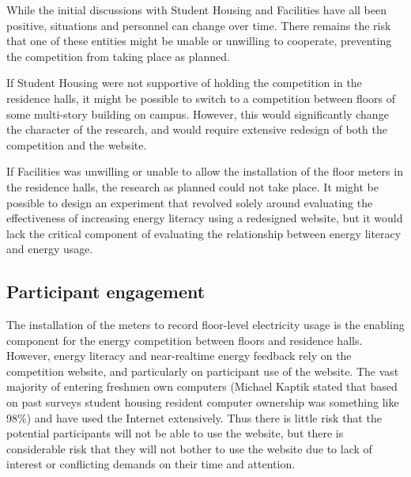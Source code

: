 While the initial discussions with Student Housing and Facilities have all been positive, situations and personnel can change over time. There remains the risk that one of these entities might be unable or unwilling to cooperate, preventing the competition from taking place as planned.

If Student Housing were not supportive of holding the competition in the residence halls, it might be possible to switch to a competition between floors of some multi-story building on campus. However, this would significantly change the character of the research, and would require extensive redesign of both the competition and the website.

If Facilities was unwilling or unable to allow the installation of the floor meters in the residence halls, the research as planned could not take place. It might be possible to design an experiment that revolved solely around evaluating the effectiveness of increasing energy literacy using a redesigned website, but it would lack the critical component of evaluating the relationship between energy literacy and energy usage.

\subsection{Participant engagement}
\label{sec:participant-engagement}

The installation of the meters to record floor-level electricity usage is the enabling component for the energy competition between floors and residence halls. However, energy literacy and near-realtime energy feedback rely on the competition website, and particularly on participant use of the website. The vast majority of entering freshmen own computers (Michael Kaptik stated that based on past surveys student housing resident computer ownership was something like 98\%) and have used the Internet extensively. Thus there is little risk that the potential participants will not be able to use the website, but there is considerable risk that they will not bother to use the website due to lack of interest or conflicting demands on their time and attention.

